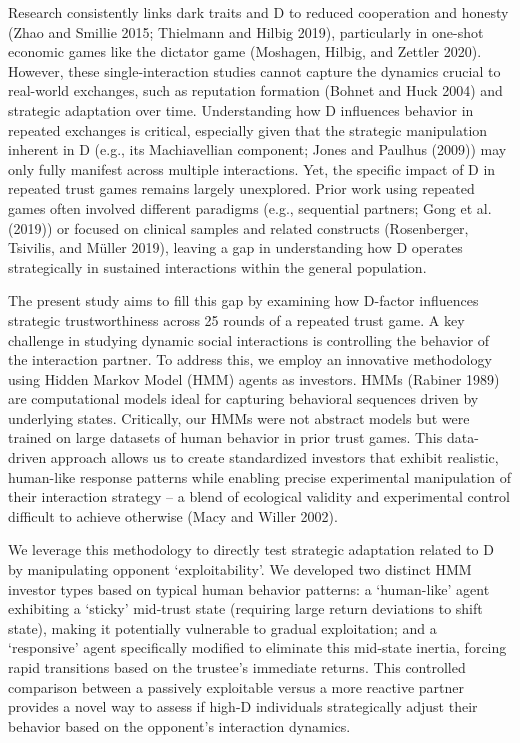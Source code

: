 \documentclass[
]{article}
\begin{document}
Research consistently links dark traits and D to reduced cooperation and honesty (Zhao and Smillie 2015; Thielmann and Hilbig 2019), particularly in one-shot economic games like the dictator game (Moshagen, Hilbig, and Zettler 2020). However, these single-interaction studies cannot capture the dynamics crucial to real-world exchanges, such as reputation formation (Bohnet and Huck 2004) and strategic adaptation over time. Understanding how D influences behavior in repeated exchanges is critical, especially given that the strategic manipulation inherent in D (e.g., its Machiavellian component; Jones and Paulhus (2009)) may only fully manifest across multiple interactions. Yet, the specific impact of D in repeated trust games remains largely unexplored. Prior work using repeated games often involved different paradigms (e.g., sequential partners; Gong et al. (2019)) or focused on clinical samples and related constructs (Rosenberger, Tsivilis, and Müller 2019), leaving a gap in understanding how D operates strategically in sustained interactions within the general population.

The present study aims to fill this gap by examining how D-factor influences strategic trustworthiness across 25 rounds of a repeated trust game. A key challenge in studying dynamic social interactions is controlling the behavior of the interaction partner. To address this, we employ an innovative methodology using Hidden Markov Model (HMM) agents as investors. HMMs (Rabiner 1989) are computational models ideal for capturing behavioral sequences driven by underlying states. Critically, our HMMs were not abstract models but were trained on large datasets of human behavior in prior trust games. This data-driven approach allows us to create standardized investors that exhibit realistic, human-like response patterns while enabling precise experimental manipulation of their interaction strategy -- a blend of ecological validity and experimental control difficult to achieve otherwise (Macy and Willer 2002).

We leverage this methodology to directly test strategic adaptation related to D by manipulating opponent `exploitability'. We developed two distinct HMM investor types based on typical human behavior patterns: a `human-like' agent exhibiting a `sticky' mid-trust state (requiring large return deviations to shift state), making it potentially vulnerable to gradual exploitation; and a `responsive' agent specifically modified to eliminate this mid-state inertia, forcing rapid transitions based on the trustee's immediate returns. This controlled comparison between a passively exploitable versus a more reactive partner provides a novel way to assess if high-D individuals strategically adjust their behavior based on the opponent's interaction dynamics.
\end{document}
